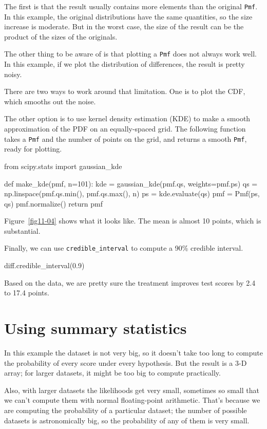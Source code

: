 \documentclass[12pt]{book}
\theoremstyle{exercise}
\newcommand{\py}[1]{{\tt #1}}%
\begin{document}
The first is that the result usually contains more elements than the
original \py{Pmf}.
In this example, the original distributions have the same quantities, so
the size increase is moderate.
But in the worst case, the size of the result can be the product of the
sizes of the originals.

The other thing to be aware of is that plotting a
\py{Pmf} does not always work well. In this
example, if we plot the distribution of differences, the result is
pretty noisy.

There are two ways to work around that limitation. One is to plot the
CDF, which smooths out the noise.

The other option is to use kernel density estimation (KDE) to make a
smooth approximation of the PDF on an equally-spaced grid.
The following function takes a \py{Pmf} and the number of points on the grid, and returns a smooth \py{Pmf}, ready for plotting.

\begin{code}
from scipy.stats import gaussian_kde

def make_kde(pmf, n=101):
    kde = gaussian_kde(pmf.qs, weights=pmf.ps)
    qs = np.linspace(pmf.qs.min(), pmf.qs.max(), n)
    ps = kde.evaluate(qs)
    pmf = Pmf(ps, qs)
    pmf.normalize()
    return pmf
\end{code}

Figure~\ref{fig11-04} shows what it looks like.
The mean is almost 10 points, which is substantial.

Finally, we can use \py{credible_interval} to
compute a 90\% credible interval.

\begin{code}
diff.credible_interval(0.9)
\end{code}

Based on the data, we are pretty sure the treatment improves test scores
by 2.4 to 17.4 points.

\section{Using summary statistics}

In this example the dataset is not very big, so it doesn't take too long
to compute the probability of every score under every hypothesis. But
the result is a 3-D array; for larger datasets, it might be too big to
compute practically.

Also, with larger datasets the likelihoods get very small, sometimes so
small that we can't compute them with normal floating-point arithmetic.
That's because we are computing the probability of a particular dataset;
the number of possible datasets is astronomically big, so the
probability of any of them is very small.
\end{document}
